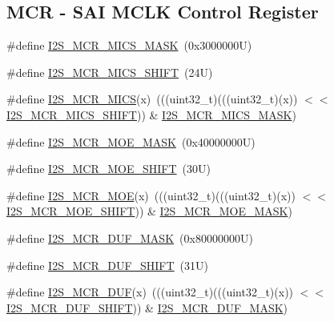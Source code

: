 \subsection*{M\+CR -\/ S\+AI M\+C\+LK Control Register}
\begin{DoxyCompactItemize}
\item 
\#define \mbox{\hyperlink{group___i2_s___register___masks_ga4c26e3cecbf702523474909a853e29b8}{I2\+S\+\_\+\+M\+C\+R\+\_\+\+M\+I\+C\+S\+\_\+\+M\+A\+SK}}~(0x3000000\+U)
\item 
\#define \mbox{\hyperlink{group___i2_s___register___masks_gabf7e721def09b1b0b95908cfafe51512}{I2\+S\+\_\+\+M\+C\+R\+\_\+\+M\+I\+C\+S\+\_\+\+S\+H\+I\+FT}}~(24\+U)
\item 
\#define \mbox{\hyperlink{group___i2_s___register___masks_gaaf72b03378aedd558df1c74b19d73f61}{I2\+S\+\_\+\+M\+C\+R\+\_\+\+M\+I\+CS}}(x)~(((uint32\+\_\+t)(((uint32\+\_\+t)(x)) $<$$<$ \mbox{\hyperlink{group___i2_s___register___masks_gabf7e721def09b1b0b95908cfafe51512}{I2\+S\+\_\+\+M\+C\+R\+\_\+\+M\+I\+C\+S\+\_\+\+S\+H\+I\+FT}})) \& \mbox{\hyperlink{group___i2_s___register___masks_ga4c26e3cecbf702523474909a853e29b8}{I2\+S\+\_\+\+M\+C\+R\+\_\+\+M\+I\+C\+S\+\_\+\+M\+A\+SK}})
\item 
\#define \mbox{\hyperlink{group___i2_s___register___masks_ga03150d6df8ff9955e1f8175ef1ebd1ab}{I2\+S\+\_\+\+M\+C\+R\+\_\+\+M\+O\+E\+\_\+\+M\+A\+SK}}~(0x40000000\+U)
\item 
\#define \mbox{\hyperlink{group___i2_s___register___masks_ga9e216aa29a6bff56351f468e127fbea5}{I2\+S\+\_\+\+M\+C\+R\+\_\+\+M\+O\+E\+\_\+\+S\+H\+I\+FT}}~(30\+U)
\item 
\#define \mbox{\hyperlink{group___i2_s___register___masks_gac0f8bc59030925b0a15485b90b243788}{I2\+S\+\_\+\+M\+C\+R\+\_\+\+M\+OE}}(x)~(((uint32\+\_\+t)(((uint32\+\_\+t)(x)) $<$$<$ \mbox{\hyperlink{group___i2_s___register___masks_ga9e216aa29a6bff56351f468e127fbea5}{I2\+S\+\_\+\+M\+C\+R\+\_\+\+M\+O\+E\+\_\+\+S\+H\+I\+FT}})) \& \mbox{\hyperlink{group___i2_s___register___masks_ga03150d6df8ff9955e1f8175ef1ebd1ab}{I2\+S\+\_\+\+M\+C\+R\+\_\+\+M\+O\+E\+\_\+\+M\+A\+SK}})
\item 
\#define \mbox{\hyperlink{group___i2_s___register___masks_ga215e9b824f46df65ca2fc57784148cae}{I2\+S\+\_\+\+M\+C\+R\+\_\+\+D\+U\+F\+\_\+\+M\+A\+SK}}~(0x80000000\+U)
\item 
\#define \mbox{\hyperlink{group___i2_s___register___masks_gae490aa013a4b379ce12be811ae32a148}{I2\+S\+\_\+\+M\+C\+R\+\_\+\+D\+U\+F\+\_\+\+S\+H\+I\+FT}}~(31\+U)
\item 
\#define \mbox{\hyperlink{group___i2_s___register___masks_gad21e3586a7f3600aa25a1e186a8e9eb9}{I2\+S\+\_\+\+M\+C\+R\+\_\+\+D\+UF}}(x)~(((uint32\+\_\+t)(((uint32\+\_\+t)(x)) $<$$<$ \mbox{\hyperlink{group___i2_s___register___masks_gae490aa013a4b379ce12be811ae32a148}{I2\+S\+\_\+\+M\+C\+R\+\_\+\+D\+U\+F\+\_\+\+S\+H\+I\+FT}})) \& \mbox{\hyperlink{group___i2_s___register___masks_ga215e9b824f46df65ca2fc57784148cae}{I2\+S\+\_\+\+M\+C\+R\+\_\+\+D\+U\+F\+\_\+\+M\+A\+SK}})
\end{DoxyCompactItemize}
